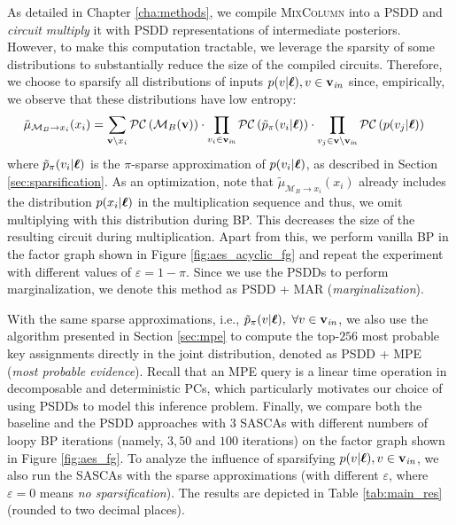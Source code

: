 As detailed in Chapter \ref{cha:methods}, we compile \textsc{MixColumn} into a PSDD and \emph{circuit multiply} it with PSDD representations of intermediate posteriors. However, to make this computation tractable, we leverage the sparsity of some distributions to substantially reduce the size of the compiled circuits. Therefore, we choose to sparsify all distributions of inputs $p(v | \boldsymbol{\ell}), v \in \mathbf{v}_{\mathit{in}}$ since, empirically, we observe that these distributions have low entropy:
\begin{align}
\label{eq:pc_message_sparse}
    \tilde{\mu}_{\mathcal{M}_B \to x_i}(x_i) &= \sum_{\mathbf{v} \setminus x_i} \mathcal{PC} \left( \mathcal{M}_B(\mathbf{v}) \right) \cdot \prod_{v_i \in \mathbf{v}_{\mathit{in}}} \mathcal{PC}\left( \tilde{p}_{\pi}(v_i | \boldsymbol{\ell}) \right) \cdot \prod_{v_j \in \mathbf{v} \setminus \mathbf{v}_{\mathit{in}}} \mathcal{PC}\left( p(v_j | \boldsymbol{\ell}) \right)
\end{align}
where $\tilde{p}_\pi(v_i | \boldsymbol{\ell})$ is the $\pi$-sparse approximation of $p(v_i | \boldsymbol{\ell})$, as described in Section \ref{sec:sparsification}. As an optimization, note that $\tilde{\mu}_{\mathcal{M}_B \to x_i}(x_i)$ already includes the distribution $p(x_i | \boldsymbol{\ell})$ in the multiplication sequence and thus, we omit multiplying with this distribution during BP. This decreases the size of the resulting circuit during multiplication. Apart from this, we perform vanilla BP in the factor graph shown in Figure \ref{fig:aes_acyclic_fg} and repeat the experiment with different values of $\varepsilon = 1 - \pi$. Since we use the PSDDs to perform marginalization, we denote this method as PSDD + MAR (\emph{marginalization}).

With the same sparse approximations, i.e., $\tilde{p}_\pi(v | \boldsymbol{\ell}), \ \forall v \in \mathbf{v}_{\mathit{in}}$, we also use the algorithm presented in Section \ref{sec:mpe} to compute the top-$256$ most probable key assignments directly in the joint distribution, denoted as PSDD + MPE (\emph{most probable evidence}). Recall that an MPE query is a linear time operation in decomposable and deterministic PCs, which particularly motivates our choice of using PSDDs to model this inference problem.
Finally, we compare both the baseline and the PSDD approaches with $3$ SASCAs with different numbers of loopy BP iterations (namely, $3,50$ and $100$ iterations) on the factor graph shown in Figure \ref{fig:aes_fg}. To analyze the influence of sparsifying $p(v | \boldsymbol{\ell}), v \in \mathbf{v}_{\mathit{in}}$, we also run the SASCAs with the sparse approximations (with different $\varepsilon$, where $\varepsilon = 0$ means \emph{no sparsification}). The results are depicted in Table \ref{tab:main_res} (rounded to two decimal places).

